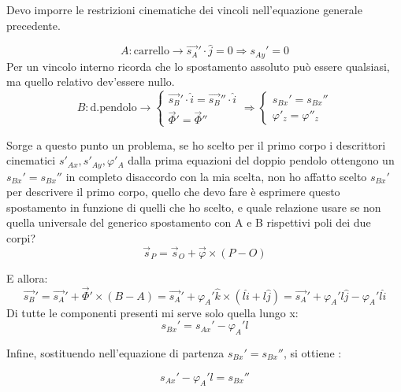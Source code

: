 \documentclass{article}
\begin{document}
\begin{adjustwidth}{2in}{}
Devo imporre le restrizioni cinematiche dei vincoli nell'equazione generale precedente. 

\[
A : \text{carrello} \rightarrow \vec{s_A}' \cdot \hat{j} = 0 \Rightarrow 
	\boxed{s_{Ay}'= 0}
\]
Per un vincolo interno ricorda che lo spostamento assoluto può essere qualsiasi, ma quello relativo dev'essere nullo. 
\[
B : \text{d.pendolo} \rightarrow \begin{cases} 
\vec{s_B}'\cdot \hat{i} = \vec{s_B}''\cdot \hat{i} \\
\vec{\Phi}' = \vec{\Phi}''
\end{cases} \Rightarrow \begin{cases} 
s_{Bx}'= s_{Bx}'' \\
\boxed{\varphi'_z = \varphi''_z}
\end{cases}
\]

Sorge a questo punto un problema, se ho scelto per il primo corpo i descrittori cinematici $s'_{Ax}, s'_{Ay},\varphi'_{A}$ dalla prima equazioni del doppio pendolo ottengono un $s_{Bx}'= s_{Bx}''$ in completo disaccordo con la mia scelta, non ho affatto scelto $s_{Bx}'$ per descrivere il primo corpo, quello che devo fare è esprimere questo spostamento in funzione di quelli che ho scelto, e quale relazione usare se non quella universale del generico spostamento con A e B rispettivi poli dei due corpi?
\[ \vec{s}_P = \vec{s}_O + \vec{\varphi} \times (P-O)\]

E allora:
\[
\vec{s_B}'= \vec{s_A}'+ \vec{\Phi}' \times (B-A) = \vec{s_A}' + \varphi_A'\hat{k} \times (l\hat{i} + l\hat{j}) = \vec{s_A}' + \varphi_A'l\hat{j} - \varphi_A'l\hat{i}
\]
Di tutte le componenti presenti mi serve solo quella lungo x:
\[
s_{Bx}'= s_{Ax}'- \varphi_A'l
\]

Infine, sostituendo nell'equazione di partenza $s_{Bx}'= s_{Bx}''$, si ottiene : 

\[
 \boxed{s_{Ax}'- \varphi_A'l = s_{Bx}''}
\]


\end{adjustwidth}
\end{document}

